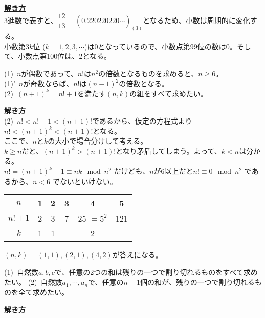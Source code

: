 \documentclass[11pt]{article}
\begin{document}
\underline{\textbf{解き方}}\\
3進数で表すと、$\dfrac{12}{13} = ( 0. \dot{2} \dot{2} \dot{0} 220220 \cdots )_{(3)}$となるため、小数は周期的に変化する。\\
小数第$3k$位 ($k=1,2,3,\cdots$)は0となっているので、小数点第99位の数は0。そして、小数点第100位は、2となる。\\

\begin{tcolorbox}[mybox={東大実践模試？の動画}]
(1)\ $n$が偶数であって、$n!$は$n^2$の倍数となるものを求めると、$n \geq 6$。\\
(1)'\ $n$が奇数ならば、$n!$は$(n-1)^2$の倍数となる。\\
(2)\ $(n+1)^k = n!+1$を満たす$(n,k)$の組をすべて求めたい。
\end{tcolorbox}

\underline{\textbf{解き方}}\\
(2)\ $n! < n!+1 < (n+1)!$であるから、仮定の方程式より$n! < (n+1)^k < (n+1)!$となる。\\
ここで、$n$と$k$の大小で場合分けして考える。\\
$k \geq n$だと、$(n+1)^k > (n+1)!$となり矛盾してしまう。よって、$k < n$は分かる。\\
$n! = (n+1)^k -1 \equiv nk  \mod n^2 $ だけども、$n$が6以上だと$n! \equiv 0 \mod n^2$ であるから、$n<6$ でないといけない。

\begin{center}
\begin{tabular}{|c|c|c|c|c|c|}
\hline
$n$ & 1 & 2 & 3 & 4 & 5\\
\hline
$n!+1$ & 2 & 3 & 7 & 25 $=5^2$ & 121\\
\hline
$k$& 1& 1 & $-$ & 2 & $-$\\
\hline
\end{tabular}
\end{center}

$(n,k) = (1,1) , (2,1) , (4,2)$が答えになる。\\

\begin{tcolorbox}[mybox={東大過去問？の動画の改良}]
(1)\ 自然数$a,b,c$で、任意の2つの和は残りの一つで割り切れるものをすべて求めたい。
(2)\ 自然数$a_1 , \cdots , a_n$で、任意の$n-1$個の和が、残りの一つで割り切れるものを全て求めたい。
\end{tcolorbox}

\underline{\textbf{解き方}}\\

\newpage
\end{document}
